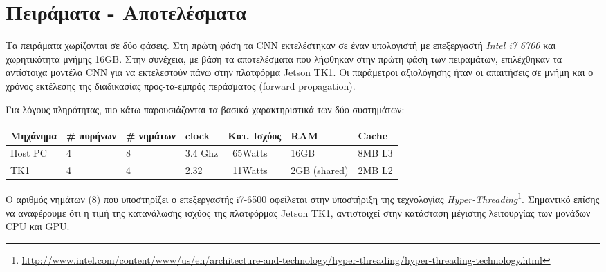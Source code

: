 \chapter{Πειράματα - Αποτελέσματα}
\label{chapter:experiments}

Τα πειράματα χωρίζονται σε δύο φάσεις. Στη πρώτη φάση τα CNN εκτελέστηκαν
σε έναν υπολογιστή με επεξεργαστή \emph{Intel i7 6700} και χωρητικότητα μνήμης
16GB. Στην συνέχεια, με βάση τα αποτελέσματα που λήφθηκαν στην πρώτη φάση των πειραμάτων, επιλέχθηκαν
τα αντίστοιχα μοντέλα CNN για να εκτελεστούν πάνω στην πλατφόρμα
Jetson TK1. Οι παράμετροι αξιολόγησης ήταν οι απαιτήσεις σε μνήμη και ο χρόνος εκτέλεσης
της διαδικασίας προς-τα-εμπρός περάσματος (forward propagation).

Για λόγους πληρότητας, πιο κάτω παρουσιάζονται τα βασικά χαρακτηριστικά
των δύο συστημάτων:
\\

\begin{table}
\small
\begin{tabular}{ | l | l | l | l | l | l | l | }
  \hline
  \rowcolor{Gray}
  Μηχάνημα & \# πυρήνων & \# νημάτων & clock & Κατ. Ισχύος & RAM & Cache \\
  \hline
  Host PC & 4 & 8 & 3.4 Ghz & ~65Watts & 16GB & 8MΒ L3 \\
  \hline
  TK1 & 4 & 4 & 2.32 & ~11Watts & 2GB (shared) & 2MB L2 \\
  \hline
\end{tabular}
\end{table}
Ο αριθμός νημάτων (8) που υποστηρίζει ο επεξεργαστής i7-6500 οφείλεται στην
υποστήριξη της τεχνολογίας \emph{Hyper-Threading}\footnote{\url{http://www.intel.com/content/www/us/en/architecture-and-technology/hyper-threading/hyper-threading-technology.html}}.
Σημαντικό επίσης να αναφέρουμε ότι η τιμή της κατανάλωσης ισχύος της
πλατφόρμας Jetson TK1, αντιστοιχεί στην κατάσταση μέγιστης λειτουργίας των μονάδων
CPU και GPU.



